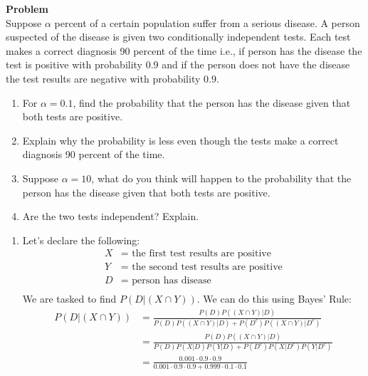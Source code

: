 \documentclass[12pt]{article}
\newenvironment{Ex}{\textbf{Problem}\vspace{.75em}\\}{}
\begin{document}
\begin{enumerate}
\begin{Ex}
    Suppose $\alpha$ percent of a certain population suffer from a
    serious disease. A person suspected of the disease is given two
    conditionally independent tests. Each test makes a correct
    diagnosis 90 percent of the time i.e., if person has the disease
    the test is positive with probability $0.9$ and if the person does
    not have the disease the test results are negative with
    probability $0.9$.
    \begin{enumerate}
    \item For $\alpha = 0.1$, find the probability that the person
      has the disease given that both tests are positive.
    \item Explain why the probability is less even though the tests
      make a correct diagnosis 90 percent of the time.
    \item Suppose $\alpha = 10$, what do you think will happen to the
      probability that the person has the disease given that both
      tests are positive.
    \item Are the two tests independent? Explain.
    \end{enumerate}
    \begin{solution} \hfill
      \begin{enumerate}
      \item Let's declare the following:
        \begin{equation}
          \label{eq:3-var-declaration}
          \begin{aligned}
            X &= \text{ the first test results are positive} \\
            Y &= \text{ the second test results are positive} \\
            D &= \text{ person has disease} \\
          \end{aligned}
        \end{equation}
        We are tasked to find $P(D | (X \cap Y))$. We can do this
        using Bayes' Rule:
        \begin{equation}
          \label{eq:4-enumeration}
          \begin{aligned}
            P(D|(X \cap Y)) &= \frac{P(D)P((X \cap Y) | D)}
            {P(D)P((X \cap Y)|D) + P(D^c)P((X \cap Y)|D^c)} \\
            &= \frac{P(D)P((X \cap Y) | D)}
            {P(D)P(X|D)P(Y|D) + P(D^c)P(X|D^c)P(Y|D^c)} \\
            &= \frac{0.001 \cdot 0.9 \cdot 0.9}
            {0.001 \cdot 0.9 \cdot 0.9 + 0.999 \cdot 0.1 \cdot 0.1} \\

\end{aligned}
\end{equation}
\end{enumerate}
\end{solution}
\end{Ex}
\end{enumerate}
\end{document}
